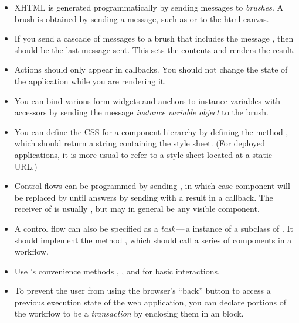 \documentclass[a4paper,10pt,twoside]{book}
\begin{document}
\begin{itemize}
  \item XHTML is generated programmatically by sending messages to \emph{brushes}. A brush is obtained by sending a message, such as  or  to the html canvas.
  \item If you send a cascade of messages to a brush that includes the message , then  should be the last message sent.
  This sets the contents and renders the result.
  \item Actions should only appear in callbacks.
You should not change the state of the application while you are rendering it.
  \item You can bind various form widgets and anchors to instance variables with accessors by sending the message  \emph{instance variable}  \emph{object} to the brush.
  \item You can define the CSS for a component hierarchy by defining the method , which should return a string containing the style sheet.
  (For deployed applications, it is more usual to refer to a style sheet located at a static URL.)
  \item Control flows can be programmed by sending , in which case component  will be replaced by  until  answers by sending  with a result in a callback.
  The receiver of  is usually , but may in general be any visible component.
  \item A control flow can also be specified as a \emph{task}\,---\,a instance of a subclass of . It should implement the method , which should call a series of components in a workflow.
  \item Use 's convenience methods , ,  and  for basic interactions.
  \item To prevent the user from using the browser's ``back'' button to access a previous execution state of the web application, you can declare portions of the workflow to be a \emph{transaction} by enclosing them in an  block.
\end{itemize}

\ifx\wholebook\relax\else 
   
   
\end{document}
